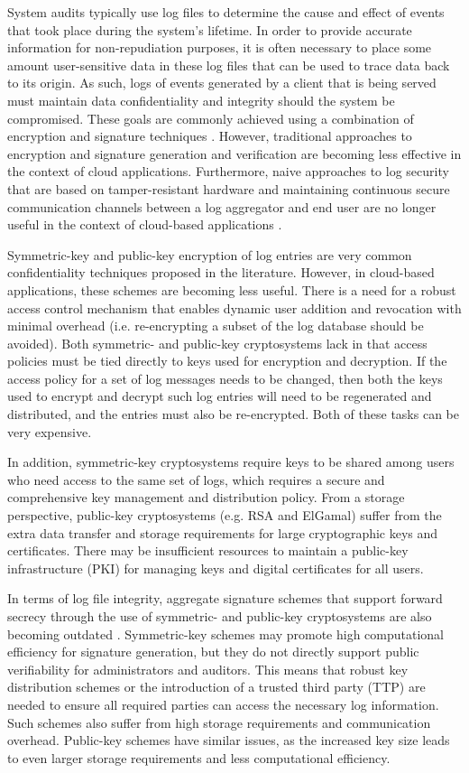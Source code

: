 \documentclass{sig-alternate}
\begin{document}
System audits typically use log files to determine the cause and effect of events that took 
place during the system's lifetime. In order to provide accurate information for non-repudiation purposes,
it is often necessary to place some amount user-sensitive data in these log files that can be used
to trace data back to its origin. As such, logs of events generated by a client that is being served must
maintain data confidentiality and integrity should the system be compromised. These goals are commonly achieved
using a combination of encryption and signature techniques \cite{Ma2008-FssAgg}. However, traditional approaches to
encryption and signature generation and verification are becoming less effective in the context of cloud
applications. Furthermore, naive approaches to log security that are based on tamper-resistant hardware and 
maintaining continuous secure communication channels between a log aggregator and end user are no longer useful in 
the context of cloud-based applications \cite{Schneier1999-Secure}. 

Symmetric-key and public-key encryption of log entries are very common confidentiality techniques 
proposed in the literature. However, in cloud-based applications, these schemes are becoming less useful.
There is a need for a robust access control mechanism that enables dynamic user addition and revocation
with minimal overhead (i.e. re-encrypting a subset of the log database should be avoided). Both symmetric- and 
public-key cryptosystems lack in that access policies must be tied directly to keys used for
encryption and decryption. If the access policy for a set of log messages needs to be changed, then both the keys used to
encrypt and decrypt such log entries will need to be regenerated and distributed, and the entries must also
be re-encrypted. Both of these tasks can be very expensive. 

In addition, symmetric-key cryptosystems require keys to be shared among users who need access to the 
same set of logs, which requires a secure and comprehensive key management and distribution policy. 
From a storage perspective, public-key cryptosystems (e.g. RSA and ElGamal) suffer from the extra data transfer and 
storage requirements for large cryptographic keys and certificates. There may be insufficient resources 
to maintain a public-key infrastructure (PKI) for managing keys and digital certificates for all users. 

In terms of log file integrity, aggregate signature schemes that support forward secrecy through the use of 
symmetric- and public-key cryptosystems are also becoming outdated \cite{Yavuz2009-BAF}. Symmetric-key schemes may promote
high computational efficiency for signature generation, but they do not directly support public verifiability for 
administrators and auditors. This means that robust key distribution schemes or the introduction of a trusted third party (TTP) are needed to ensure all required parties can access the necessary log information. Such schemes also 
suffer from high storage requirements and communication overhead. Public-key schemes have similar issues, 
as the increased key size leads to even larger storage requirements and less computational efficiency. 
\end{document}
